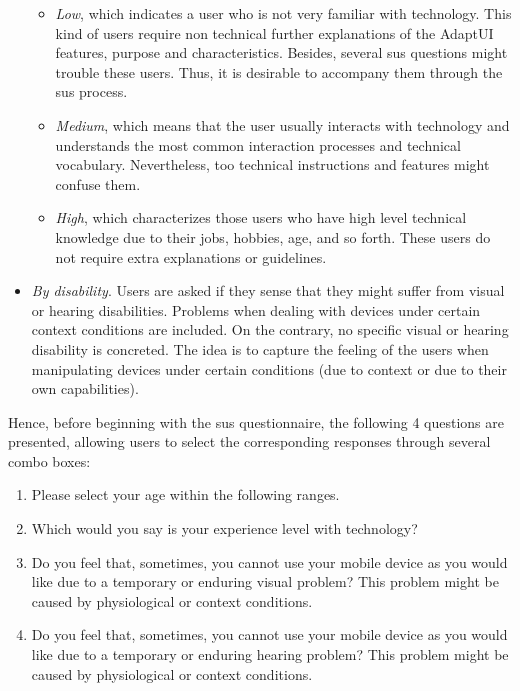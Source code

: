 \begin{itemize}
  \begin{itemize}
    \item \textit{Low}, which indicates a user who is not very familiar with 
    technology. This kind of users require non technical further explanations of 
    the AdaptUI features, purpose and characteristics. Besides, several \ac{sus} 
    questions might trouble these users. Thus, it is desirable to accompany them 
    through the \ac{sus} process.
  
    \item \textit{Medium}, which means that the user usually interacts with 
    technology and understands the most common interaction processes and technical 
    vocabulary. Nevertheless, too technical instructions and features might 
    confuse them.
    
    \item \textit{High}, which characterizes those users who have high level 
    technical knowledge due to their jobs, hobbies, age, and so forth. These 
    users do not require extra explanations or guidelines.
  \end{itemize}
  
  \item \textit{By disability}. Users are asked if they sense that they might 
  suffer from visual or hearing disabilities. Problems when dealing with devices 
  under certain context conditions are included. On the contrary, no specific 
  visual or hearing disability is concreted. The idea is to capture the feeling 
  of the users when manipulating devices under certain conditions (due to context 
  or due to their own capabilities).
\end{itemize}

Hence, before beginning with the \ac{sus} questionnaire, the following 4 questions
are presented, allowing users to select the corresponding responses through
several combo boxes:

\begin{enumerate}[label=\alph*)]
  \item Please select your age within the following ranges.
  \item Which would you say is your experience level with technology?
  \item Do you feel that, sometimes, you cannot use your mobile device as you
  would like due to a temporary or enduring visual problem? This problem might
  be caused by physiological or context conditions.
  \item Do you feel that, sometimes, you cannot use your mobile device as you
  would like due to a temporary or enduring hearing problem? This problem might
  be caused by physiological or context conditions.
\end{enumerate}

